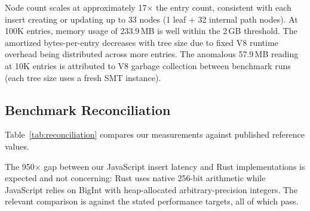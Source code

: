 Node count scales at approximately 17$\times$ the entry count, consistent with each insert creating or updating up to 33 nodes (1 leaf + 32 internal path nodes). At 100K entries, memory usage of 233.9\,MB is well within the 2\,GB threshold. The amortized bytes-per-entry decreases with tree size due to fixed V8 runtime overhead being distributed across more entries. The anomalous 57.9\,MB reading at 10K entries is attributed to V8 garbage collection between benchmark runs (each tree size uses a fresh SMT instance).

\subsection{Benchmark Reconciliation}

Table~\ref{tab:reconciliation} compares our measurements against published reference values.

\begin{table}[htbp]
\centering
\caption{Benchmark reconciliation with published data.}
\label{tab:reconciliation}
\end{table}

The 950$\times$ gap between our JavaScript insert latency and Rust implementations is expected and not concerning: Rust uses native 256-bit arithmetic while JavaScript relies on BigInt with heap-allocated arbitrary-precision integers. The relevant comparison is against the stated performance targets, all of which pass.
